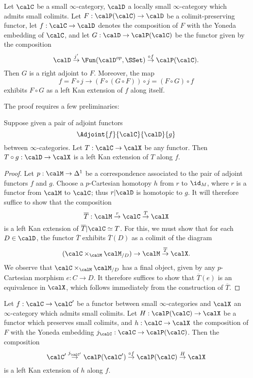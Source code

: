 \begin{corollary}\label{coughspaz}
Let $\calC$ be a small $\infty$-category, $\calD$ a locally small $\infty$-category which admits small colimits. Let $F: \calP(\calC) \rightarrow \calD$ be a colimit-preserving functor, let
$f: \calC \rightarrow \calD$ denotes the composition of $F$ with the Yoneda embedding of
$\calC$, and let $G: \calD \rightarrow \calP(\calC)$ be the functor given by the composition
$$ \calD \stackrel{j'}{\rightarrow} \Fun( \calD^{op}, \SSet) \stackrel{\circ f}{\rightarrow} \calP(\calC).$$
Then $G$ is a right adjoint to $F$. Moreover, the map 
$$f = F \circ j \rightarrow (F \circ (G \circ F)) \circ j = (F \circ G) \circ f$$
exhibits $F \circ G$ as a left Kan extension of $f$ along itself.
\end{corollary}

The proof requires a few preliminaries:

\begin{lemma}\label{stimp}
Suppose given a pair of adjoint functors
$$ \Adjoint{f}{\calC}{\calD}{g}$$
between $\infty$-categories. Let $T: \calC \rightarrow \calX$ be any functor. Then
$T \circ g: \calD \rightarrow \calX$ is a left Kan extension of $T$ along $f$.
\end{lemma}

\begin{proof}
Let $p: \calM \rightarrow \Delta^1$ be a correspondence associated to the pair of adjoint functors
$f$ and $g$. Choose a $p$-Cartesian homotopy $h$ from $r$ to $\id_{M}$, where
$r$ is a functor from $\calM$ to $\calC$; thus $r | \calD$ is homotopic to $g$. 
It will therefore suffice to show that the composition
$$ \overline{T}: \calM \stackrel{r}{\rightarrow} \calC \stackrel{T}{\rightarrow} \calX$$
is a left Kan extension of $\overline{T} | \calC \simeq T$. For this, we must show that
for each $D \in \calD$, the functor $\overline{T}$ exhibits $\overline{T}(D)$
as a colimit of the diagram
$$ (\calC \times_{\calM} \calM_{/D}) \rightarrow \calM \stackrel{\overline{T}}{\rightarrow} \calX.$$
We observe that $\calC \times_{\calM} \calM_{/D}$ has a final object, given by any
$p$-Cartesian morphism $e: C \rightarrow D$. It therefore suffices to show that
$\overline{T}(e)$ is an equivalence in $\calX$, which follows immediately from the construction of $\overline{T}$.
\end{proof}

\begin{lemma}\label{kanspaz}
Let $f: \calC \rightarrow \calC'$ be a functor between small $\infty$-categories and
$\calX$ an $\infty$-category which admits small colimits.
Let $H: \calP(\calC) \rightarrow \calX$ be a functor which preserves small colimits, and 
$h: \calC \rightarrow \calX$ the composition of $F$ with the Yoneda embedding $j_{\calC}: \calC \rightarrow \calP(\calC)$. Then the composition 
$$\calC' \stackrel{j_{\calC'}}{\rightarrow} \calP(\calC') \stackrel{ \circ f}{\rightarrow} \calP(\calC)
\stackrel{H}{\rightarrow} \calX$$
is a left Kan extension of $h$ along $f$.
\end{lemma}

